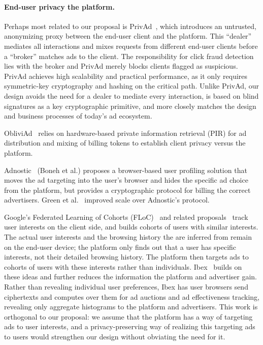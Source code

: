 \paragraph{End-user privacy \vs the platform.}
%
Perhaps most related to our proposal is PrivAd~\cite{privad}, which introduces
an untrusted, anonymizing proxy between the end-user client and the platform.
%
This ``dealer'' mediates all interactions and mixes requests from different
end-user clients before a ``broker'' matches ads to the client.
%
The responsibility for click fraud detection lies with the broker and PrivAd
merely blocks clients flagged as suspicious.
%
PrivAd achieves high scalability and practical performance, as it only requires
symmetric-key cryptography and hashing on the critical path.
%
Unlike PrivAd, our design avoids the need for a dealer to mediate every
interaction, is based on blind signatures as a key cryptographic primitive,
and more closely matches the design and business processes of today's
ad ecosystem.
%

%
ObliviAd~\cite{obliviad} relies on hardware-based private information retrieval
(PIR) for ad distribution and mixing of billing tokens to establish client
privacy versus the platform.
%
%

%
Adnostic~\cite{adnostic} (Boneh et al.) proposes a browser-based user profiling
solution that moves the ad targeting into the user's browser and hides the
specific ad choice from the platform, but provides a cryptographic protocol for
billing the correct advertisers.
%
Green et al.~\cite{adnostic+} improved scale over Adnostic's protocol.
%
%

%
Google's Federated Learning of Cohorts (FLoC)~\cite{google-floc} and related
proposals~\cite{google-topic-based} track user interests
on the client side, and builds cohorts of users with similar interests.
%
The actual user interests and the browsing history the are inferred from remain
on the end-user device; the platform only finds out that a user has specific
interests, not their detailed browsing history.
%
The platform then targets ads to cohorts of users with these interests rather
than individuals.
%
Ibex~\cite{ibex} builds on these ideas and further reduces the information the platform
and advertiser gain.
%
Rather than revealing individual user preferences, Ibex has user browsers send
ciphertexts and computes over them for ad auctions and ad effectiveness tracking,
revealing only aggregate histograms to the platform and advertisers.
%
This work is orthogonal to our proposal: we assume that the platform has a way
of targeting ads to user interests, and a privacy-preserving way of realizing this
targeting ads to users would strengthen our design without obviating the need for it.
%

